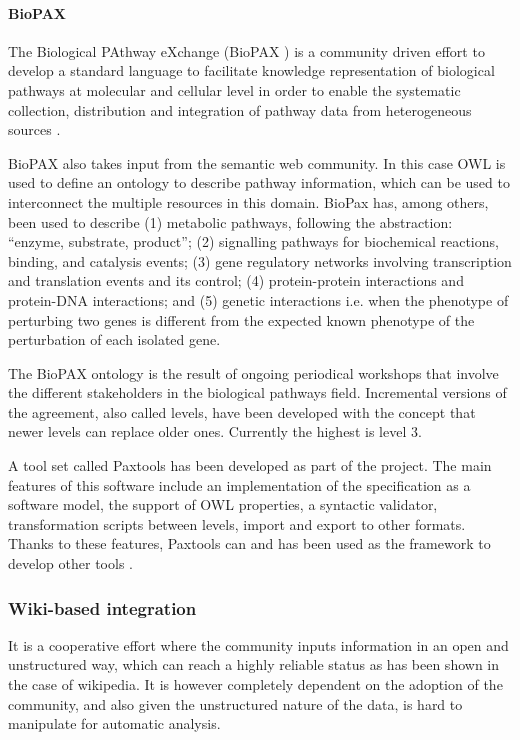 \paragraph{BioPAX}
The Biological PAthway eXchange (BioPAX ) is a community driven effort to develop a standard language to facilitate knowledge representation of biological pathways at molecular and cellular level in order to enable the systematic collection, distribution and integration of pathway data from heterogeneous sources \cite{DEM2010}.

BioPAX also takes input from the semantic web community. In this case OWL is used to define an ontology to describe pathway information, which can be used to interconnect the multiple resources in this domain. BioPax has, among others, been used to describe (1) metabolic pathways, following the abstraction: ``enzyme, substrate, product''; (2) signalling pathways for biochemical reactions, binding, and catalysis events; (3) gene regulatory networks involving transcription and translation events and its control; (4) protein-protein interactions and protein-DNA interactions; and (5) genetic interactions i.e. when the phenotype of perturbing two genes is different from the expected known phenotype of the perturbation of each isolated gene.

The BioPAX ontology is the result of ongoing periodical workshops that involve the different stakeholders in the biological pathways field. Incremental versions of the agreement, also called levels, have been developed with the concept that newer levels can replace older ones. Currently the highest  is level 3.

A tool set called Paxtools has been developed as part of the project. The main features of this software include an implementation of the specification as a software model, the support of OWL properties, a syntactic validator, transformation scripts between levels, import and export to other formats. Thanks to these features, Paxtools can and has been used as the framework to develop other tools \cite{DEM2010}.

\subsubsection{Wiki-based integration} 
It is a cooperative effort where the community inputs information in an open and unstructured way, which can reach a highly reliable status as has been shown in the case of wikipedia. It is however completely dependent on the adoption of the community, and also given the unstructured nature of the data, is hard to manipulate for automatic analysis.

